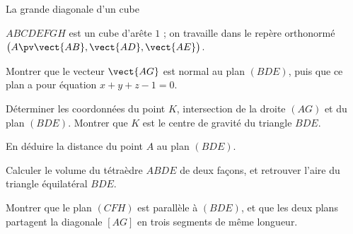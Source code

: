 \begin{exercice}[3]{La grande diagonale d'un cube}
\begin{codecote}[0.6]
$ABCDEFGH$ est un cube d'arête $1$ ; on travaille dans le repère orthonormé $\big(A\pv\vect{AB},\vect{AD},\vect{AE}\big)$.
\begin{questions}
  \item Montrer que le vecteur $\vect{AG}$ est normal au plan $(BDE)$, puis que ce plan a pour équation $x+y+z-1=0$.
  \item Déterminer les coordonnées du point $K$, intersection de la droite $(AG)$ et du plan $(BDE)$. Montrer que $K$ est le centre de
    gravité du triangle $BDE$.
  \item En déduire la distance du point $A$ au plan $(BDE)$.
  \item Calculer le volume du tétraèdre $ABDE$ de deux façons, et retrouver l'aire du triangle équilatéral $BDE$.
  \item Montrer que le plan $(CFH)$ est parallèle à $(BDE)$, et que les deux plans partagent la diagonale $[AG]$ en trois segments
    de même longueur.
\end{questions}
\cote
\centering
{}
\end{codecote}
\end{exercice}
